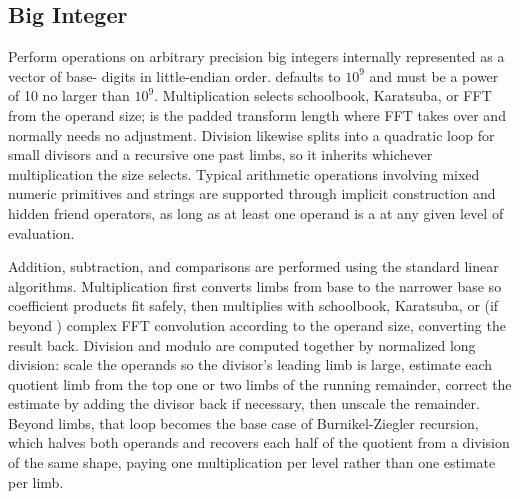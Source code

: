 \subsection{Big Integer}
\label{sec:6.4.2}
Perform operations on arbitrary precision big integers internally represented as a vector of base- digits in little-endian order.  defaults to $10^9$ and must be a power of 10 no larger than $10^9$. Multiplication selects schoolbook, Karatsuba, or FFT from the operand size;  is the padded transform length where FFT takes over and normally needs no adjustment. Division likewise splits into a quadratic loop for small divisors and a recursive one past  limbs, so it inherits whichever multiplication the size selects. Typical arithmetic operations involving mixed numeric primitives and strings are supported through implicit construction and hidden friend operators, as long as at least one operand is a  at any given level of evaluation.

Addition, subtraction, and comparisons are performed using the standard linear algorithms. Multiplication first converts limbs from base  to the narrower base  so coefficient products fit safely, then multiplies with schoolbook, Karatsuba, or (if beyond ) complex FFT convolution according to the operand size, converting the result back. Division and modulo are computed together by normalized long division: scale the operands so the divisor's leading limb is large, estimate each quotient limb from the top one or two limbs of the running remainder, correct the estimate by adding the divisor back if necessary, then unscale the remainder. Beyond  limbs, that loop becomes the base case of Burnikel-Ziegler recursion, which halves both operands and recovers each half of the quotient from a division of the same shape, paying one multiplication per level rather than one estimate per limb.

